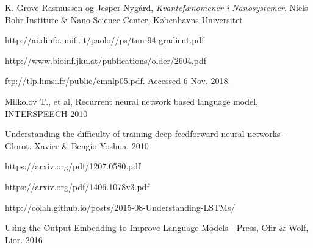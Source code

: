 \documentclass[a4paper]{article}
\begin{document}
\begin{thebibliography}{9}
  K. Grove-Rasmussen og Jesper Nygård,
  \emph{Kvantefænomener i Nanosystemer}.
  Niels Bohr Institute \& Nano-Science Center, Københavns Universitet


  http://ai.dinfo.unifi.it/paolo//ps/tnn-94-gradient.pdf

  http://www.bioinf.jku.at/publications/older/2604.pdf

  ftp://tlp.limsi.fr/public/emnlp05.pdf. Accessed 6 Nov. 2018.
  
  Milkolov T., et al, Recurrent neural network based language model, INTERSPEECH 2010
  
  Understanding the difficulty of training deep feedforward neural networks - Glorot, Xavier \& Bengio Yoshua. 2010

  https://arxiv.org/pdf/1207.0580.pdf

  https://arxiv.org/pdf/1406.1078v3.pdf
  
  http://colah.github.io/posts/2015-08-Understanding-LSTMs/

  Using the Output Embedding to Improve Language Models - Press, Ofir \& Wolf, Lior. 2016

\end{thebibliography}
\end{document}

